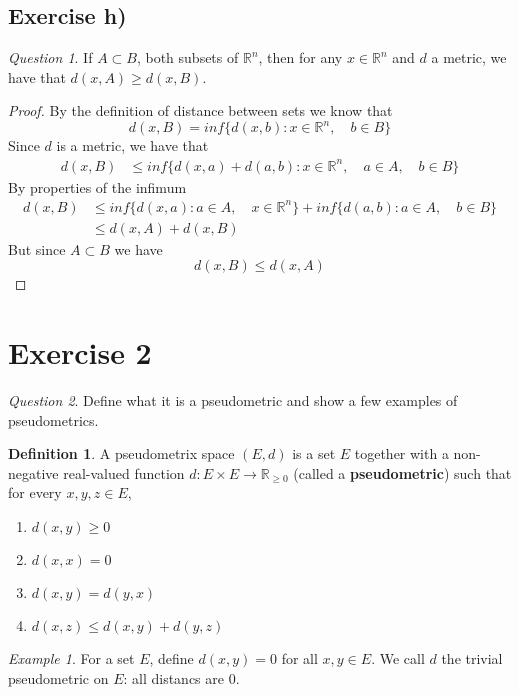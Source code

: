 \documentclass{article}
\theoremstyle{definition}
\newtheorem{definition}{Definition}
\theoremstyle{remark}
\theoremstyle{remark}
\newtheorem{question}{Question}
\theoremstyle{example}
\newtheorem{example}{Example}
\begin{document}
\subsection*{Exercise h)} 
\begin{question}
If $A \subset B$, both subsets of $\mathbb{R}^{n}$, then for any $x \in \mathbb{R}^{n}$ and $d$ a metric, we have that $d(x,A) \geq d(x,B)$.
\end{question}

\begin{proof}
By the definition of distance between sets we know that 
\[d(x,B) = inf \{ d(x,b) : x \in \mathbb{R}^{n}, \quad b \in B \} \]
Since $d$ is a metric, we have that
\begin{align*}
    d(x,B) &\leq inf \{d(x,a) + d(a,b) : x \in \mathbb{R}^{n}, \quad a \in A, \quad b \in B \}
\end{align*}
By properties of the infimum
\begin{align*}
    d(x,B) &\leq inf \{ d(x,a) : a \in A, \quad x \in \mathbb{R}^{n}\} + inf \{ d(a,b) : a \in A, \quad b \in B\} \\
    &\leq d(x,A) + d(x,B)
\end{align*}
But since $A \subset B$ we have
\[
d(x,B) \leq d(x,A)
\]
\end{proof}

\section*{Exercise 2}

\begin{question}
Define what it is a pseudometric and show a few examples of pseudometrics.
\end{question}

\begin{definition}
A pseudometrix space $(E,d)$ is a set $E$ together with a non-negative real-valued function $d : E \times E \to \mathbb{R}_{\geq 0}$ (called a \textbf{pseudometric}) such that for every $x,y,z \in E$,
\begin{enumerate}
    \item $d(x,y) \geq 0$
    \item $d(x,x) = 0$
    \item $d(x,y) = d(y,x)$
    \item $d(x,z) \leq d(x,y) + d(y,z)$
\end{enumerate}
\end{definition}

\begin{example}
For a set $E$, define $d(x,y) = 0$ for all $x,y \in E$. We call $d$ the trivial pseudometric on $E$: all distancs are $0$.
\end{example}
\end{document}
